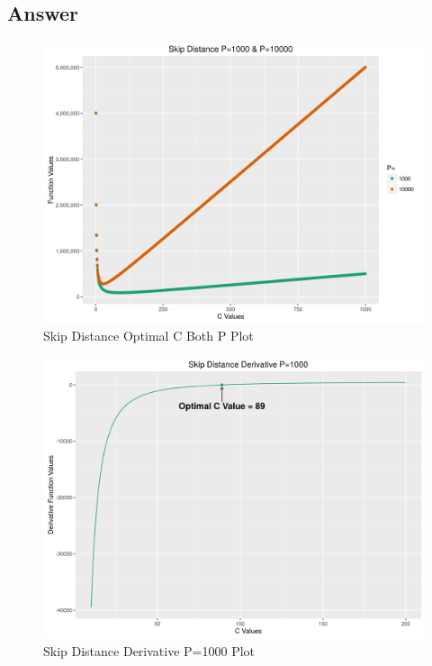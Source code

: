 \documentclass[11pt]{article}
\begin{document}
\subsection{Answer}
\begin{figure}[h]
\includegraphics[width=\columnwidth]{code/skipDistanceBoth.png}
\caption{Skip Distance Optimal C Both P Plot}
\label{fig:skbp}
\end{figure}
\begin{figure}[h]
\includegraphics[width=\columnwidth]{code/skipDistanceD.png}
\caption{Skip Distance Derivative P=1000 Plot}
\label{fig:skdp}
\end{figure}
\end{document}
